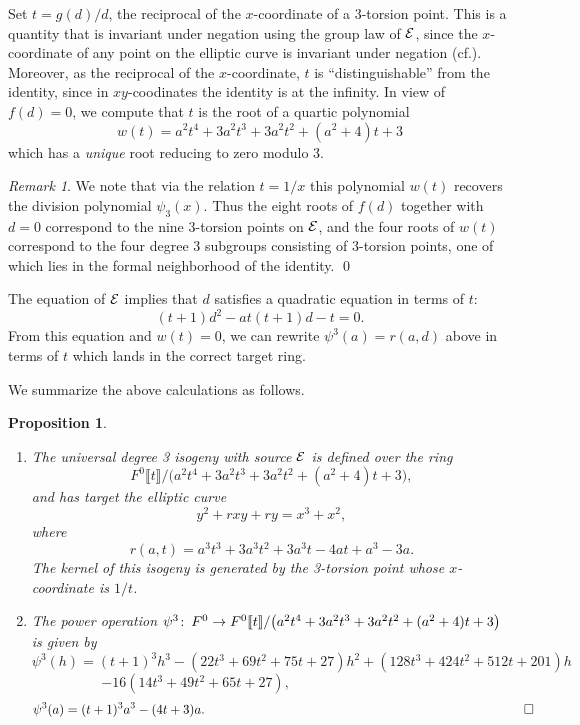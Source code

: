\documentclass{gtpart}
\newtheorem{prop}[thm]{Proposition}
\theoremstyle{definition}
\theoremstyle{remark}
\newtheorem{rmk}[thm]{Remark}
\def\co{\colon\thinspace}
\newcommand{\cff}[2]{cf.\thinspace{\cite[#1]{#2}}}
\begin{document}
Set $t = g(d)/d$, the reciprocal of the $x$-coordinate of a 3-torsion point.  
This is a quantity that is invariant under negation using the group law of 
$\cal E$, since the $x$-coordinate of any point on the elliptic curve is 
invariant under negation (\cff{III.2.3(a)}{AEC}).  Moreover, as the reciprocal 
of the $x$-coordinate, $t$ is ``distinguishable'' from the identity, since in 
$xy$-coodinates the identity is at the infinity.  In view of $f(d) = 0$, we 
compute that $t$ is the root of a quartic polynomial 
\[
 w(t) = a^2 t^4 + 3 a^2 t^3 + 3 a^2 t^2 + (a^2 + 4) t + 3 
\]
which has a {\em unique} root reducing to zero modulo 3.  
\begin{rmk}
\label{rmk:subgroups}
 We note that via the relation $t = 1/x$ this polynomial $w(t)$ recovers the 
 division polynomial $\psi_3(x)$.  Thus the eight roots of $f(d)$ together 
 with $d = 0$ correspond to the nine 3-torsion points on $\cal E$, and the 
 four roots of $w(t)$ correspond to the four degree 3 subgroups consisting of 
 3-torsion points, one of which lies in the formal neighborhood of the 
 identity.  \qed
\end{rmk}
The equation of $\cal E$ implies that $d$ satisfies a quadratic equation in 
terms of $t$: 
\[
 (t + 1) d^2 - a t (t + 1) d - t = 0.  
\]
From this equation and $w(t) = 0$, we can rewrite $\psi^3(a) = r(a,d)$ above 
in terms of $t$ which lands in the correct target ring.  

We summarize the above calculations as follows.  
\begin{prop}
\label{prop}
 \mbox{}
 \begin{enumerate}
  \item The universal degree 3 isogeny with source $\cal E$ is defined over 
  the ring 
  \[
   F^0 \llbracket t \rrbracket / 
   \big(a^2 t^4 + 3 a^2 t^3 + 3 a^2 t^2 + (a^2 + 4) t + 3\big), 
  \]
  and has target the elliptic curve 
  \[
   y^2 + r x y + r y = x^3 + x^2, 
  \]
  where 
  \[
   r(a,t) = a^3 t^3 + 3 a^3 t^2 + 3 a^3 t - 4 a t + a^3 - 3 a.  
  \]
  The kernel of this isogeny is generated by the 3-torsion point whose 
  $x$-coordinate is $1/t$.  
  \item The power operation $\psi^3\co F^0  \to F^0 \llbracket t \rrbracket / 
  \big(a^2 t^4 + 3 a^2 t^3 + 3 a^2 t^2 + (a^2 + 4) t + 3\big)$ is given by 
  \[
   \psi^3(h) = (t + 1)^3 h^3 - (22 t^3 + 69 t^2 + 75 t + 27) h^2 + (128 t^3 + 
   424 t^2 + 512 t + 201) h 
  \]
  \[
   - 16 (14 t^3 + 49 t^2 + 65 t + 27), 
   ~~~~~~~~~~~~~~~~~~~~~~~~~~~~~~~~~~~~~~~~~~~~~~~~~ 
  \]
  \[
   \psi^3(a) = (t + 1)^3 a^3 - (4 t + 3) a.  
   ~~~~~~~~~~~~~~~~~~~~~~~~~~~~~~~~~~~~~~~~~~~~~~~~~~~~~~~~~~~~~~~~~~~~~ \qed
  \]
 \end{enumerate}
\end{prop}
\end{document}
